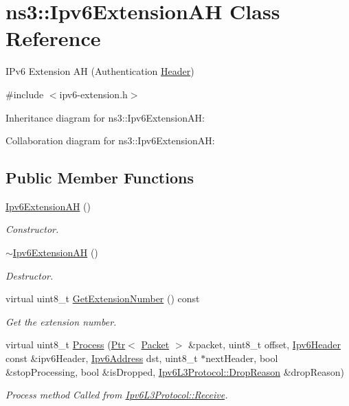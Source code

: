 \hypertarget{classns3_1_1Ipv6ExtensionAH}{}\section{ns3\+:\+:Ipv6\+Extension\+AH Class Reference}
\label{classns3_1_1Ipv6ExtensionAH}


I\+Pv6 Extension AH (Authentication \hyperlink{classns3_1_1Header}{Header})  




{\ttfamily \#include $<$ipv6-\/extension.\+h$>$}



Inheritance diagram for ns3\+:\+:Ipv6\+Extension\+AH\+:


Collaboration diagram for ns3\+:\+:Ipv6\+Extension\+AH\+:
\subsection*{Public Member Functions}
\begin{DoxyCompactItemize}
\item 
\hyperlink{classns3_1_1Ipv6ExtensionAH_adf374891ec88d684919c6e6ab0d51e48}{Ipv6\+Extension\+AH} ()
\begin{DoxyCompactList}\small\item\em Constructor. \end{DoxyCompactList}\item 
\hyperlink{classns3_1_1Ipv6ExtensionAH_acc8a22556b6683b449cb7a723b42ab23}{$\sim$\+Ipv6\+Extension\+AH} ()
\begin{DoxyCompactList}\small\item\em Destructor. \end{DoxyCompactList}\item 
virtual uint8\+\_\+t \hyperlink{classns3_1_1Ipv6ExtensionAH_ac90ec72defc925723e098193ac982a93}{Get\+Extension\+Number} () const 
\begin{DoxyCompactList}\small\item\em Get the extension number. \end{DoxyCompactList}\item 
virtual uint8\+\_\+t \hyperlink{classns3_1_1Ipv6ExtensionAH_ad610f5c405e3b56d195da450442d416b}{Process} (\hyperlink{classns3_1_1Ptr}{Ptr}$<$ \hyperlink{classns3_1_1Packet}{Packet} $>$ \&packet, uint8\+\_\+t offset, \hyperlink{classns3_1_1Ipv6Header}{Ipv6\+Header} const \&ipv6\+Header, \hyperlink{classns3_1_1Ipv6Address}{Ipv6\+Address} dst, uint8\+\_\+t $\ast$next\+Header, bool \&stop\+Processing, bool \&is\+Dropped, \hyperlink{classns3_1_1Ipv6L3Protocol_a33c64db9bc35f71ff368b132bfffa37a}{Ipv6\+L3\+Protocol\+::\+Drop\+Reason} \&drop\+Reason)
\begin{DoxyCompactList}\small\item\em Process method Called from \hyperlink{classns3_1_1Ipv6L3Protocol_a8a95d576e8aee9a571db93bf686d850a}{Ipv6\+L3\+Protocol\+::\+Receive}. \end{DoxyCompactList}\end{DoxyCompactItemize}
